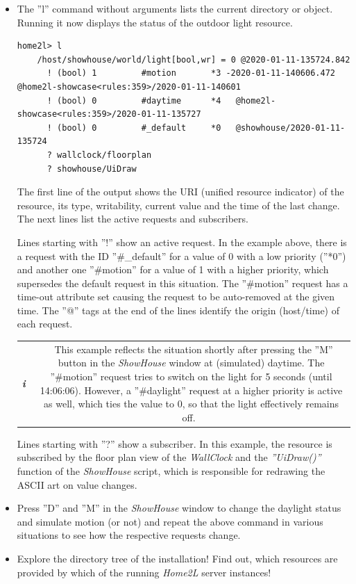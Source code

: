 \documentclass[12pt,english,parskip=half,headheight=19pt]{scrreprt}
\newcommand{\infobox}[1]{
  \par
  \medskip
  \hfill
  \setlength\arrayrulewidth{1pt}
  \begin{tabular}[t]{c|c|}
    \parbox{1.8em}{\hfill\textit{\Huge\textbf{i}\,}}
    &
    \,\parbox{0.89\linewidth}{\setlength{\parskip}{0.5em} \small #1}\,
  \end{tabular}
  \medskip
  \par
}
\begin{document}
\begin{itemize}[$\blacktriangleright$]
\item
  The ''l'' command without arguments lists the current directory or object. 
  Running it now displays the status of the outdoor light resource.
  \begin{lstlisting}[language=home2l]
    home2l> l
    /host/showhouse/world/light[bool,wr] = 0 @2020-01-11-135724.842
      ! (bool) 1         #motion       *3 -2020-01-11-140606.472   @home2l-showcase<rules:359>/2020-01-11-140601
      ! (bool) 0         #daytime      *4   @home2l-showcase<rules:359>/2020-01-11-135727
      ! (bool) 0         #_default     *0   @showhouse/2020-01-11-135724
      ? wallclock/floorplan
      ? showhouse/UiDraw
  \end{lstlisting}

  The first line of the output shows the URI (unified resource indicator)
  of the resource, its type, writability, current value and the time of
  the last change. The next lines list the active requests and
  subscribers.

  Lines starting with ''!'' show an active request. In the example
  above, there is a request with the ID ''\#\_default'' for a value of 0
  with a low priority (''*0'') and another one ''\#motion'' for a value of 1
  with a higher priority, which supersedes the default request in this
  situation. The ''\#motion'' request has a time-out attribute set causing
  the request to be auto-removed at the given time. The ''@'' tags at the
  end of the lines identify the origin (host/time) of each request.

  \infobox{
    This example reflects the situation shortly after pressing the ''M''
    button in the \textit{ShowHouse} window at (simulated) daytime.
    The ''\#motion'' request tries to switch on the light for 5 seconds
    (until 14:06:06). However, a ''\#daylight'' request at a higher
    priority is active as well, which ties the value to 0, so that the
    light effectively remains off.
  }

  Lines starting with ''?'' show a subscriber. In this example, the resource is subscribed by
  the floor plan view of the \textit{WallClock} and the \textit{''UiDraw()''} function of 
  the \textit{ShowHouse} script, which is responsible for redrawing the ASCII art on value changes.

\item
  Press ''D'' and ''M'' in the \textit{ShowHouse} window to change the daylight
  status and simulate motion (or not) and repeat the above command in
  various situations to see how the respective requests change.

\item
  Explore the directory tree of the installation! Find out, which resources are
  provided by which of the running \textit{Home2L} server instances!

\end{itemize}
\end{document}

